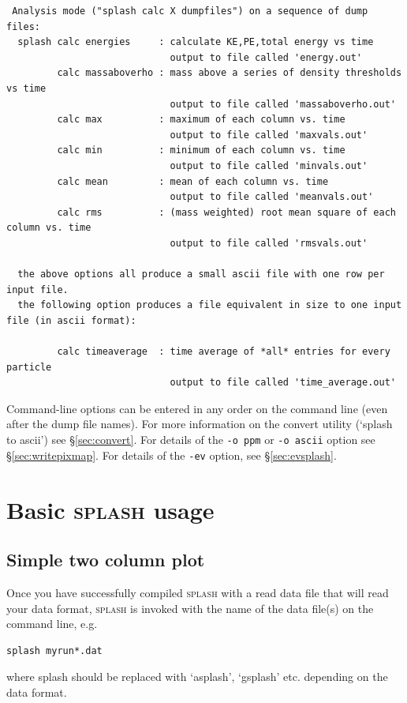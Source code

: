 \documentclass[a4paper,10pt]{article}
\newcommand{\splash}{\textsc{splash }}
\begin{document}
\begin{verbatim}
 Analysis mode ("splash calc X dumpfiles") on a sequence of dump files: 
  splash calc energies     : calculate KE,PE,total energy vs time
                             output to file called 'energy.out'
         calc massaboverho : mass above a series of density thresholds vs time
                             output to file called 'massaboverho.out'
         calc max          : maximum of each column vs. time
                             output to file called 'maxvals.out'
         calc min          : minimum of each column vs. time
                             output to file called 'minvals.out'
         calc mean         : mean of each column vs. time
                             output to file called 'meanvals.out'
         calc rms          : (mass weighted) root mean square of each column vs. time
                             output to file called 'rmsvals.out'

  the above options all produce a small ascii file with one row per input file.
  the following option produces a file equivalent in size to one input file (in ascii format):

         calc timeaverage  : time average of *all* entries for every particle
                             output to file called 'time_average.out'
\end{verbatim}

 Command-line options can be entered in any order on the command line (even after the dump file names). For more information on the convert utility (`splash to ascii') see \S\ref{sec:convert}. For details of the \verb+-o ppm+ or \verb+-o ascii+ option see \S\ref{sec:writepixmap}. For details of the \verb+-ev+ option, see \S\ref{sec:evsplash}.

\section{Basic \splash usage}%
\label{sec:basic}

\subsection{Simple two column plot}
 Once you have successfully compiled \splash with a read data file that will read your data format,
\splash is invoked with the name of the data
file(s) on the command line, e.g.
\begin{verbatim}
splash myrun*.dat
\end{verbatim}
where splash should be replaced with `asplash', `gsplash' etc. depending on the data format. \\
\end{document}
